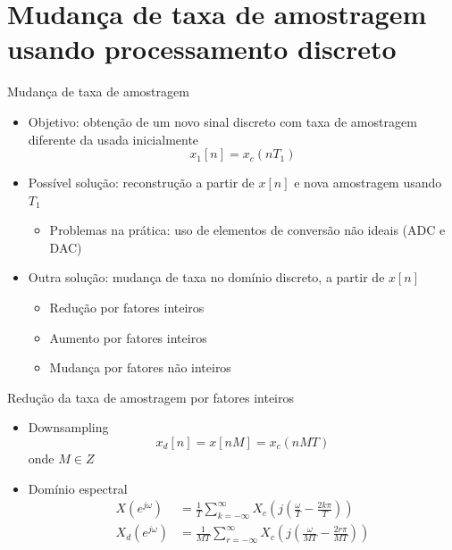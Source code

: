 \section{Mudança de taxa de amostragem usando processamento discreto}
\begin{slide}{Mudança de taxa de amostragem}
	\begin{itemize}
		\item Objetivo: obtenção de um novo sinal discreto com taxa de amostragem diferente da usada inicialmente
			\begin{equation*}
				x_1[n] = x_c(nT_1)
			\end{equation*}
		\item Possível solução: reconstrução a partir de $x[n]$ e nova amostragem usando $T_1$
		\begin{itemize}
			\item Problemas na prática: uso de elementos  de conversão não ideais (ADC e DAC)
		\end{itemize}
		\item Outra solução: mudança de taxa no domínio discreto, a partir de $x[n]$
		\begin{itemize}
			\item Redução por fatores inteiros
			\item Aumento por fatores inteiros
			\item Mudança por fatores não inteiros
		\end{itemize}
	\end{itemize}
\end{slide}

\begin{slide}{Redução da taxa de amostragem por fatores inteiros}
	\begin{itemize}
		\item Downsampling
			\begin{equation*}
				x_d[n] = x[nM] = x_c(nMT)
			\end{equation*}
			onde $M \in Z$
		\item Domínio espectral
			\begin{align*}
     				X(e^{j\omega})& = \frac{1}{T}\sum_{k=-\infty}^{\infty}X_c\left(j\left(\frac{\omega}{T}-\frac{2k\pi}{T}\right )\right )\\
				X_d(e^{j\omega})& = \frac{1}{MT}\sum_{r=-\infty}^{\infty}X_c\left(j\left(\frac{\omega}{MT}-\frac{2r\pi}{MT}\right )\right )
			\end{align*}
	\end{itemize}
\end{slide}

